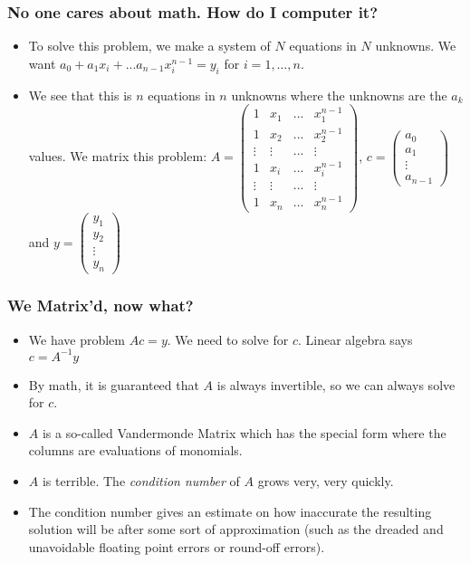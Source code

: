 \documentclass{beamer}
\begin{document}
\begin{frame}
\frametitle{No one cares about math. How do I computer it?}
\begin{itemize}
\item To solve this problem, we make a system of $N$ equations in $N$ unknowns. We want $a_0 + a_1 x_i + ... a_{n-1}x_i^{n-1} = y_i$ for $i=1,\dots, n$. 
\item We see that this is $n$ equations in $n$ unknowns where the unknowns are the $a_k$ values. We matrix this problem:
$A = \begin{pmatrix}
1 & x_1 & ... & x_1^{n-1}\\
1 & x_2 & ... & x_2^{n-1} \\
\vdots & \vdots & ... & \vdots \\
1 & x_i &... & x_i^{n-1} \\
\vdots & \vdots & ... & \vdots \\
1 & x_n & ... & x_n^{n-1}
\end{pmatrix}$, $c = \begin{pmatrix} a_0 \\ a_1 \\ \vdots \\ a_{n-1} \end{pmatrix}$ and  $ 
y = \begin{pmatrix}
y_1 \\ y_2 \\ \vdots \\ y_n
\end{pmatrix}
$ 
\end{itemize}
\end{frame}

\begin{frame}
\frametitle{We Matrix'd, now what?}
\begin{itemize}
\item We have problem $Ac = y$. We need to solve for $c$. Linear algebra says $c = A^{-1}y$
\item By math, it is guaranteed that $A$ is always invertible, so we can always solve for $c$.
\item $A$ is a so-called Vandermonde Matrix which has the special form where the columns are evaluations of monomials.
\item $A$ is terrible. The \emph{condition number} of $A$ grows very, very quickly.
\item The condition number gives an estimate on how inaccurate the resulting solution will be after some sort of approximation (such as the dreaded and unavoidable floating point errors or round-off errors).
\end{itemize}
\end{frame}
\end{document}
